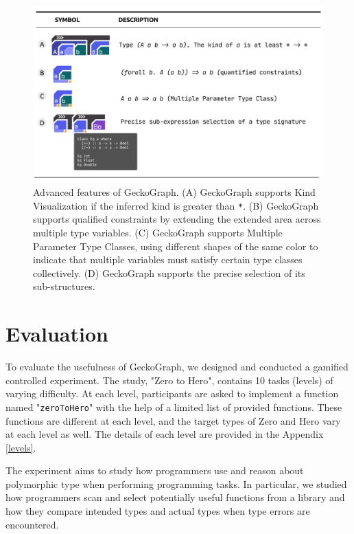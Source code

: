 \documentclass[preprint,12pt]{elsarticle}
\begin{document}
\begin{figure}
  \includegraphics[width=\linewidth]{figures/Advanced}
  \caption{\label{fig:advanced}
  Advanced features of GeckoGraph. (A) GeckoGraph supports Kind Visualization if the inferred kind is greater than \texttt{*}. (B) GeckoGraph supports qualified constraints by extending the extended area across multiple type variables. (C) GeckoGraph supports Multiple Parameter Type Classes, using different shapes of the same color to indicate that multiple variables must satisfy certain type classes collectively. (D) GeckoGraph supports the precise selection of its sub-structures. }
\end{figure}


\section{Evaluation} \label{sec:evaluation}
To evaluate the usefulness of GeckoGraph, we designed and conducted a gamified controlled experiment. The study, "Zero to Hero", contains 10 tasks (levels) of varying difficulty. At each level, participants are asked to implement a function named "\texttt{zeroToHero}" with the help of a limited list of provided functions. These functions are different at each level, and the target types of Zero and Hero vary at each level as well. The details of each level are provided in the Appendix \ref{levels}. 

The experiment aims to study how programmers use and reason about polymorphic type when performing programming tasks. In particular, we studied how programmers scan and select potentially useful functions from a library and how they compare intended types and actual types when type errors are encountered.
\end{document}
